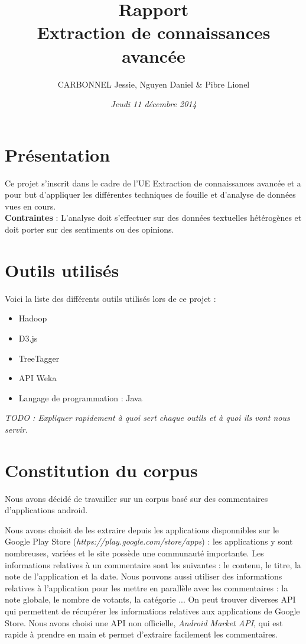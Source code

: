 \documentclass[a4paper, 11pt]{article}
\title{\textbf{Rapport}\\\Large{Extraction de connaissances avancée}}
\author{CARBONNEL Jessie, Nguyen Daniel \& Pibre Lionel}
\date{\textit{Jeudi 11 décembre 2014}}
\begin{document}
\maketitle

\section{Présentation}
Ce projet s'inscrit dans le cadre de l'UE Extraction de connaissances avancée et a pour but d'appliquer les différentes techniques de fouille et d'analyse de données vues en cours.\\

\textbf{Contraintes} : L'analyse doit s'effectuer sur des données textuelles hétérogènes et doit porter sur des sentiments ou des opinions.

\section{Outils utilisés}
Voici la liste des différents outils utilisés lors de ce projet : 
\begin{itemize}
\item Hadoop
\item D3.js
\item TreeTagger
\item API Weka
\item Langage de programmation : Java
\end{itemize}

\textit{TODO : Expliquer rapidement à quoi sert chaque outils et à quoi ils vont nous servir.}

\section{Constitution du corpus}

Nous avons décidé de travailler sur un corpus basé sur des commentaires d'applications android.

Nous avons choisit de les extraire depuis les applications disponnibles sur le Google Play Store (\textit{https://play.google.com/store/apps}) : les applications y sont nombreuses, variées et le site possède une communauté importante.
Les informations relatives à un commentaire sont les suivantes : le contenu, le titre, la note de l'application et la date. Nous pouvons aussi utiliser des informations relatives à l'application pour les mettre en parallèle avec les commentaires : la note globale, le nombre de votants, la catégorie ...
On peut trouver diverses API qui permettent de récupérer les informations relatives aux applications de Google Store. Nous avons choisi une API non officielle, \textit{Android Market API}, qui est rapide à prendre en main et permet d'extraire facilement les commentaires.
\end{document}
